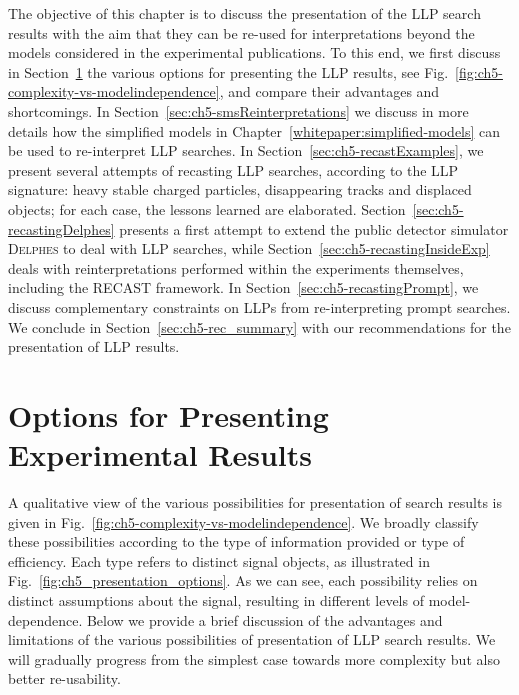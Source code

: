The objective of this chapter is to discuss the presentation of the LLP search results  
with the aim that they can be re-used for interpretations beyond the models considered in the 
experimental publications.  
To this end, we first discuss in Section~\ref{sec:ch5-options} the various options 
for presenting the LLP results, see Fig.~\ref{fig:ch5-complexity-vs-modelindependence}, and compare their advantages and
shortcomings. 
In Section~\ref{sec:ch5-smsReinterpretations} we discuss in more details how the simplified models in {\color{blue}Chapter~\ref{whitepaper:simplified-models}} can be used to re-interpret LLP searches. 
In Section~\ref{sec:ch5-recastExamples}, we present several attempts of recasting LLP searches, 
according to the LLP signature: heavy stable charged particles,
disappearing tracks and displaced objects; for each case, the lessons learned are elaborated. 
Section~\ref{sec:ch5-recastingDelphes} presents a first attempt to
extend the public detector simulator \textsc{Delphes} %
to deal with LLP searches, while 
Section~\ref{sec:ch5-recastingInsideExp} deals with reinterpretations performed within the experiments themselves, 
including the RECAST framework.  
In Section~\ref{sec:ch5-recastingPrompt}, we discuss complementary constraints on LLPs from re-interpreting prompt searches. 
We conclude in Section~\ref{sec:ch5-rec_summary} with our %
recommendations for the presentation of LLP results. 


\section{Options for Presenting Experimental Results} 
\label{sec:ch5-options}

A qualitative view of the various possibilities for presentation
of search results is given in
Fig.~\ref{fig:ch5-complexity-vs-modelindependence}.
We broadly classify these possibilities according to the type of
information provided or type of efficiency.
Each type refers to distinct signal objects, as illustrated in
Fig.~\ref{fig:ch5_presentation_options}.
As we can see, each possibility relies on distinct assumptions about
the signal, resulting in different levels of model-dependence.
Below we provide a brief discussion of the advantages and limitations of the
various possibilities of presentation of LLP search results.
We will gradually progress from the simplest case towards more complexity but
also better re-usability.


